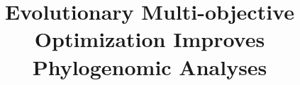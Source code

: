 \documentclass[runningheads]{llncs}
\begin{document}
%
\title{Evolutionary Multi-objective Optimization Improves Phylogenomic Analyses}
\author{}
\institute{}
%
\maketitle              %
%

 
 







%
%
%



%
\end{document}
